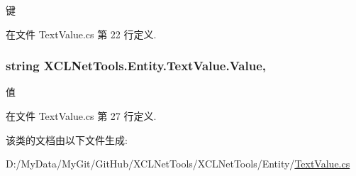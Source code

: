 键 



在文件 Text\-Value.\-cs 第 22 行定义.

\hypertarget{class_x_c_l_net_tools_1_1_entity_1_1_text_value_a8a193486b942adc898433bd29db3eff7}{
\subsubsection[{Value}]{\setlength{\rightskip}{0pt plus 5cm}string X\-C\-L\-Net\-Tools.\-Entity.\-Text\-Value.\-Value\hspace{0.3cm}{\ttfamily [get]}, {\ttfamily [set]}}}\label{class_x_c_l_net_tools_1_1_entity_1_1_text_value_a8a193486b942adc898433bd29db3eff7}


值 



在文件 Text\-Value.\-cs 第 27 行定义.



该类的文档由以下文件生成\-:\begin{DoxyCompactItemize}
\item 
D\-:/\-My\-Data/\-My\-Git/\-Git\-Hub/\-X\-C\-L\-Net\-Tools/\-X\-C\-L\-Net\-Tools/\-Entity/\hyperlink{_text_value_8cs}{Text\-Value.\-cs}\end{DoxyCompactItemize}
